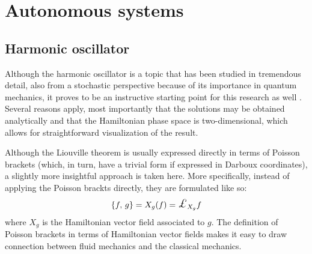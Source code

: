 \chapter{Autonomous systems}

\section{Harmonic oscillator}
Although the harmonic oscillator is a topic that has been studied in tremendous detail, also from a stochastic perspective because of its importance in quantum mechanics, it proves to be an instructive starting point for this research as well \cite{Dekker1975}. Several reasons apply, most importantly that the solutions may be obtained analytically and that the Hamiltonian phase space is two-dimensional, which allows for straightforward visualization of the result.

Although the Liouville theorem is usually expressed directly in terms of Poisson brackets (which, in turn, have a trivial form if expressed in Darboux coordinates), a slightly more insightful approach is taken here. More specifically, instead of applying the Poisson brackts directly, they are formulated like so:
$$ \poisson{f}{g} = X_g(f) = \lied{X_g}{f} $$
where $X_g$ is the Hamiltonian vector field associated to $g$. The definition of Poisson brackets in terms of Hamiltonian vector fields makes it easy to draw connection between fluid mechanics and the classical mechanics.

